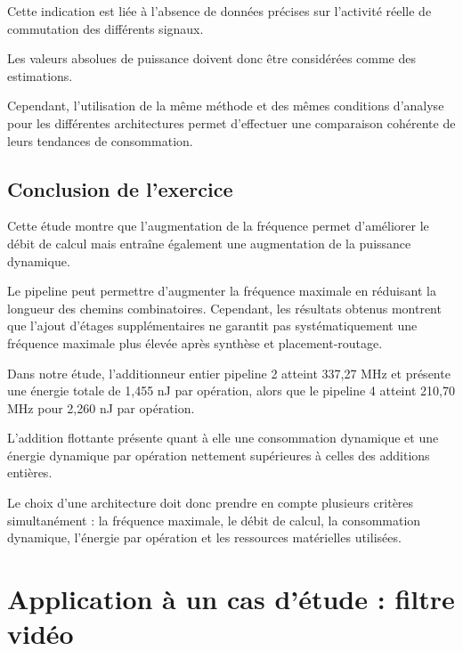 \documentclass[12pt,a4paper]{article}
\begin{document}
Cette indication est liée à l'absence de données précises sur
l'activité réelle de commutation des différents signaux.

Les valeurs absolues de puissance doivent donc être considérées
comme des estimations.

Cependant, l'utilisation de la même méthode et des mêmes conditions
d'analyse pour les différentes architectures permet d'effectuer
une comparaison cohérente de leurs tendances de consommation.



\subsection{Conclusion de l'exercice}

Cette étude montre que l'augmentation de la fréquence permet
d'améliorer le débit de calcul mais entraîne également une
augmentation de la puissance dynamique.

Le pipeline peut permettre d'augmenter la fréquence maximale en
réduisant la longueur des chemins combinatoires. Cependant, les
résultats obtenus montrent que l'ajout d'étages supplémentaires
ne garantit pas systématiquement une fréquence maximale plus élevée
après synthèse et placement-routage.

Dans notre étude, l'additionneur entier pipeline 2 atteint
337,27 MHz et présente une énergie totale de 1,455 nJ par opération,
alors que le pipeline 4 atteint 210,70 MHz pour 2,260 nJ par
opération.

L'addition flottante présente quant à elle une consommation
dynamique et une énergie dynamique par opération nettement
supérieures à celles des additions entières.

Le choix d'une architecture doit donc prendre en compte plusieurs
critères simultanément : la fréquence maximale, le débit de calcul,
la consommation dynamique, l'énergie par opération et les ressources
matérielles utilisées.



\newpage

\section{Application à un cas d'étude : filtre vidéo}
\end{document}
